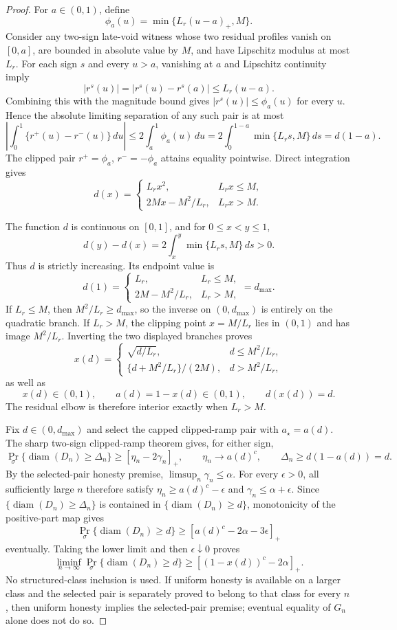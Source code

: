 \documentclass{article}
\begin{document}
\begin{proof}
For \(a\in(0,1)\), define
\[
 \phi_a(u)=\min\{L_r(u-a)_+,M\}.
\]
Consider any two-sign late-void witness whose two residual profiles vanish on \([0,a]\), are bounded in absolute value by \(M\), and have Lipschitz modulus at most \(L_r\).  For each sign \(s\) and every \(u>a\), vanishing at \(a\) and Lipschitz continuity imply
\[
 |r^s(u)|=|r^s(u)-r^s(a)|\le L_r(u-a).
\]
Combining this with the magnitude bound gives \(|r^s(u)|\le\phi_a(u)\) for every \(u\).  Hence the absolute limiting separation of any such pair is at most
\[
 \left|\int_0^1\{r^+(u)-r^-(u)\}\,du\right|
 \le2\int_a^1\phi_a(u)\,du
 =2\int_0^{1-a}\min\{L_rs,M\}\,ds
 =d(1-a).
\]
The clipped pair \(r^+=\phi_a\), \(r^-=-\phi_a\) attains equality pointwise.  Direct integration gives
\[
 d(x)=
 \begin{cases}
 L_rx^2,&L_rx\le M,\\
 2Mx-M^2/L_r,&L_rx>M.
 \end{cases}
\]

The function \(d\) is continuous on \([0,1]\), and for \(0\le x<y\le1\),
\[
 d(y)-d(x)=2\int_x^y\min\{L_rs,M\}\,ds>0.
\]
Thus \(d\) is strictly increasing.  Its endpoint value is
\[
 d(1)=
 \begin{cases}
 L_r,&L_r\le M,\\
 2M-M^2/L_r,&L_r>M,
 \end{cases}
 =d_{\max}.
\]
If \(L_r\le M\), then \(M^2/L_r\ge d_{\max}\), so the inverse on \((0,d_{\max})\) is entirely on the quadratic branch.  If \(L_r>M\), the clipping point \(x=M/L_r\) lies in \((0,1)\) and has image \(M^2/L_r\).  Inverting the two displayed branches proves
\[
 x(d)=
 \begin{cases}
 \sqrt{d/L_r},&d\le M^2/L_r,\\
 \{d+M^2/L_r\}/(2M),&d>M^2/L_r,
 \end{cases}
\]
as well as
\[
 x(d)\in(0,1),
 \qquad a(d)=1-x(d)\in(0,1),
 \qquad d(x(d))=d.
\]
The residual elbow is therefore interior exactly when \(L_r>M\).

Fix \(d\in(0,d_{\max})\) and select the capped clipped-ramp pair with \(a_\star=a(d)\).  The sharp two-sign clipped-ramp theorem gives, for either sign,
\[
 \Pr_\sigma\{\operatorname{diam}(D_n)\ge\Delta_n\}
 \ge[\eta_n-2\gamma_n]_+,
 \qquad
 \eta_n\longrightarrow a(d)^c,
 \qquad
 \Delta_n\ge d(1-a(d))=d.
\]
By the selected-pair honesty premise, \(\limsup_n\gamma_n\le\alpha\).  For every \(\epsilon>0\), all sufficiently large \(n\) therefore satisfy \(\eta_n\ge a(d)^c-\epsilon\) and \(\gamma_n\le\alpha+\epsilon\).  Since \(\{\operatorname{diam}(D_n)\ge\Delta_n\}\) is contained in \(\{\operatorname{diam}(D_n)\ge d\}\), monotonicity of the positive-part map gives
\[
 \Pr_\sigma\{\operatorname{diam}(D_n)\ge d\}
 \ge[a(d)^c-2\alpha-3\epsilon]_+
\]
eventually.  Taking the lower limit and then \(\epsilon\downarrow0\) proves
\[
 \liminf_{n\to\infty}\Pr_\sigma\{\operatorname{diam}(D_n)\ge d\}
 \ge[(1-x(d))^c-2\alpha]_+.
\]
No structured-class inclusion is used.  If uniform honesty is available on a larger class and the selected pair is separately proved to belong to that class for every \(n\), then uniform honesty implies the selected-pair premise; eventual equality of \(G_n\) alone does not do so.


\end{proof}
\end{document}
